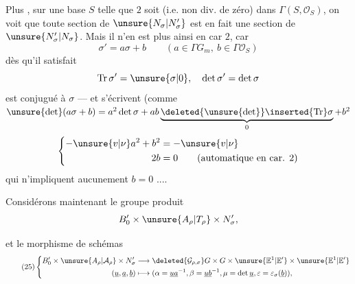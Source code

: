 Plus , sur une base $S$ telle que
$2$  soit  
(i.e. non div. de zéro) dans $\Gamma(S,\mathcal O_S)$, on voit que toute section de
$\unsure{N_\sigma|N'_\sigma}$ est en fait une section de $\unsure{N'_\sigma|N_\sigma}$.
Mais il n'en est plus ainsi en car $2$, car
\[
\sigma'=a\sigma+b\qquad(a\in\Gamma G_m,\ b\in\Gamma\mathcal O_S)
\]
dès qu'il satisfait
\[
\operatorname{Tr}\sigma'=\unsure{\sigma|0},\quad\det\sigma'=\det\sigma
\]
est conjugué  à $\sigma$ --- et
 
s'écrivent (comme
$\unsure{\det}(a\sigma+b)=a^2\det\sigma+
 ab\underbrace{\deleted{\unsure{\det}}\inserted{\operatorname{Tr}}\sigma}_{0}+b^2$
\[
\left\{\begin{aligned}
-\unsure{v|\nu}a^2+b^2&=-\unsure{v|\nu}\\
2b&=0\qquad(\text{automatique en car. }2)
\end{aligned}\right.
\]
qui n'impliquent aucunement $b=0$ ....

 Considérons maintenant le groupe produit
\[
B'_0\times\unsure{A_\rho|T_\rho}\times N'_\sigma,
\]


et le morphisme de schémas
\[
\tag{25}
\left\{\begin{aligned}
B'_0\times\unsure{A_\rho|\mathcal A_\rho}\times N'_\sigma
&\longrightarrow \deleted{\mathcal G_{\rho,\sigma}}
 G\times G\times\unsure{\mathbb E^1|\mathbb E'}\times\unsure{\mathbb E^1|\mathbb E'}\\
(\underline u,\underline a,\underline b)
&\longmapsto
(\alpha=\underline u\underline a^{-1},\beta=\underline u\underline b^{-1},
\mu=\det\underline u,\varepsilon=\varepsilon_\sigma(\underline b)),
\end{aligned}\right.
\]

